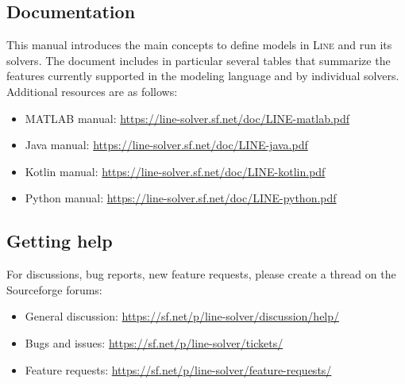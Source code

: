 
\subsection{Documentation}
This manual introduces the main concepts to define models in \textsc{Line} and run its solvers. The document includes in particular several tables that summarize the features currently supported in the modeling language and by individual solvers. Additional resources are as follows:
\begin{itemize}
\item MATLAB manual: \url{https://line-solver.sf.net/doc/LINE-matlab.pdf}
\item Java manual: \url{https://line-solver.sf.net/doc/LINE-java.pdf}
\item Kotlin manual: \url{https://line-solver.sf.net/doc/LINE-kotlin.pdf}
\item Python manual: \url{https://line-solver.sf.net/doc/LINE-python.pdf}
\end{itemize}

\subsection{Getting help}
For discussions, bug reports, new feature requests, please create a thread on the Sourceforge forums:
\begin{itemize}
\item General discussion: \url{https://sf.net/p/line-solver/discussion/help/}
\item Bugs and issues: \url{https://sf.net/p/line-solver/tickets/}
\item Feature requests: \url{https://sf.net/p/line-solver/feature-requests/}
\end{itemize}

